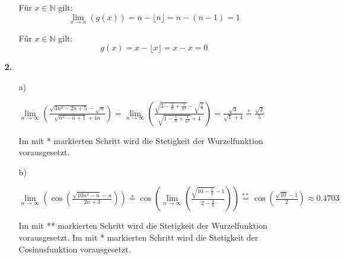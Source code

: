\documentclass[a4paper,11pt]{scrartcl}
\newcommand{\bra}[1]{\left(#1\right)}
\newcommand{\limn}[1]{\lim\limits_{n \rightarrow \infty}\bra{#1}}
\begin{document}
\begin{enumerate}
\begin{enumerate}

                Für $x     \in \mathbb{N}$ gilt:
                $$\lim\limits_{x \rightarrow n}\bra{g(x)} = n - \lfloor n \rfloor = n - (n - 1) = 1$$

                Für $x     \in \mathbb{N}$ gilt:
                $$g(x) = x - \lfloor x \rfloor = x - x = 0$$
        \end{enumerate}

    \newpage
    \item[\textbf{2.}]
        \begin{enumerate}
            \item[a)]

                $\limn{\frac{\sqrt{3n^2-2n+5} - \sqrt{n}}{\sqrt{n^2 - n + 1} + 4n}}
                = \limn{\frac{\sqrt{3-\frac{2}{n}+\frac{5}{n^2}} - \sqrt{\frac{1}{n}}}{\sqrt{1 - \frac{1}{n} + \frac{1}{n^2}} + 4}}
                = \frac{\sqrt{3}}{\sqrt{1} + 4} \stackrel{*}{=} \frac{\sqrt{3}}{5}$

                Im mit * markierten Schritt wird die Stetigkeit der Wurzelfunktion vorausgesetzt.

            \item[b)]

                $\limn{\cos\bra{\frac{\sqrt{10n^2-n}-n}{2n + 3}}}
                \stackrel{*}{=} \cos\bra{\limn{\frac{\sqrt{10 - \frac{1}{n}} - 1}{2 - \frac{3}{n}}}}
                \stackrel{**}{=} \cos\bra{\frac{\sqrt{10} - 1}{2}}
                \approx 0.4703$

                Im mit ** markierten Schritt wird die Stetigkeit der Wurzelfunktion vorausgesetzt.
                Im mit * markierten Schritt wird die Stetigkeit der Cosinusfunktion vorausgesetzt.


\end{enumerate}
\end{enumerate}
\end{document}
